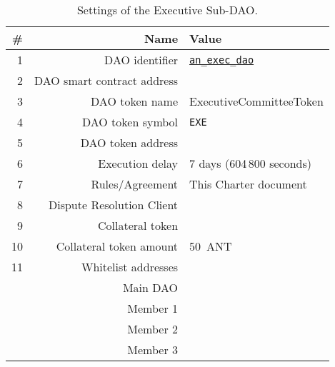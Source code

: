 \begin{table}[h!]
	\caption{Settings of the Executive Sub-DAO.}
	\centering
	\begin{tabular}{rrl}
		\toprule
		\# & Name & Value \\
		\midrule
		1 & \ac{DAO} identifier & \href{https://govern.aragon.org/\#/daos/an_exec_dao}{\texttt{an\_exec\_dao}}\\
		2 & \ac{DAO} smart contract address & \execSubDaoAddr\\
		3 & \ac{DAO} token name & ExecutiveCommitteeToken\\
		4 & \ac{DAO} token symbol & \texttt{EXE}\\
		5 & \ac{DAO} token address & \execSubDaoTokenAddr\\
		6 & Execution delay & 7 days (604\,800 seconds)\\
		7 & Rules/Agreement & This Charter document\\
		8 & Dispute Resolution Client & \aragonCourtAddr\\
		9 & Collateral token & \antTokenAddr\\
		10 & Collateral token amount & 50~\ac{ANT}\\
		11 & Whitelist addresses \\
		& Main \ac{DAO} & \mainDaoAddr\\
		& Member 1 & \execSubDaoMemberAddrI\\
		& Member 2 & \execSubDaoMemberAddrII\\
		& Member 3 & \execSubDaoMemberAddrIII\\
		\bottomrule
	\end{tabular}
\end{table}

\clearpage


